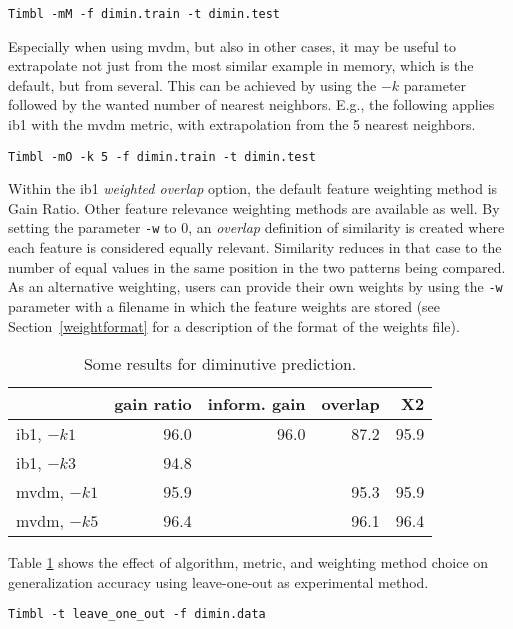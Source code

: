 \documentclass{report}
\begin{document}
{\small
\begin{verbatim}
Timbl -mM -f dimin.train -t dimin.test
\end{verbatim}
}

Especially when using {\sc mvdm}, but also in other cases, it may be
useful to extrapolate not just from the most similar example in
memory, which is the default, but from several. This can be achieved
by using the $-k$ parameter followed by the wanted number of nearest
neighbors. E.g., the following applies {\sc ib1} with the {\sc mvdm}
metric, with extrapolation from the 5 nearest neighbors.

{\small
\begin{verbatim}
Timbl -mO -k 5 -f dimin.train -t dimin.test
\end{verbatim}
}

Within the {\sc ib1} {\em weighted overlap} option, the default
feature weighting method is Gain Ratio. Other feature relevance
weighting methods are available as well.  By setting the parameter
{\tt -w} to 0, an {\em overlap} definition of similarity is created
where each feature is considered equally relevant. Similarity reduces
in that case to the number of equal values in the same position in the
two patterns being compared. As an alternative weighting, users can
provide their own weights by using the {\tt -w} parameter with a
filename in which the feature weights are stored (see
Section~\ref{weightformat} for a description of the format of the
weights file).

\begin{table}
\begin{tabular}{|l|r|r|r|r|}\hline
             & gain ratio & inform. gain & overlap & X2 \\
\hline
{\sc ib1}, $-k1$ & 96.0 & 96.0 & 87.2 & 95.9 \\
{\sc ib1}, $-k3$ & 94.8 &  &  &  \\
{\sc mvdm}, $-k1$ & 95.9  &  & 95.3 & 95.9 \\
{\sc mvdm}, $-k5$ & 96.4 & & 96.1 & 96.4\\
\hline
\end{tabular}
\caption{Some results for diminutive prediction.}
\label{diminresults}
\end{table}

Table \ref{diminresults} shows the effect of algorithm, metric, and
weighting method choice on generalization accuracy using leave-one-out
as experimental method.

{\small
\begin{verbatim}
Timbl -t leave_one_out -f dimin.data
\end{verbatim}
}
\end{document}
